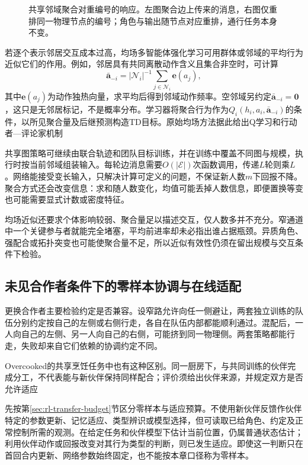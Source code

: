 \begin{figure}[htbp]
 \centering
 
 \caption{共享邻域聚合对重编号的响应。左图聚合边上传来的消息，右图仅重排同一物理节点的编号；角色与输出随节点对应重排，通行任务本身不变。}
 \label{fig:rl-multi-agent-graph}
\end{figure}

若逐个表示邻居交互成本过高，均场多智能体强化学习可用群体或邻域的平均行为近似它们的作用。例如，邻居具有共同离散动作含义且集合非空时，可计算
\[
 \bar{\bm a}_{-i}
 =|\mathcal N_i|^{-1}\sum_{j\in\mathcal N_i}\bm e(a_j),
\]
其中$\bm e(a_j)$为动作独热向量，求平均后得到邻域动作频率。空邻域另约定$\bar{\bm a}_{-i}=\bm0$，这只是无邻居标记，不是概率分布。学习器将聚合行为作为$Q_i(h_i,a_i,\bar{\bm a}_{-i})$的条件，以所见聚合量及后继预测构造TD目标。原始均场方法据此给出Q学习和行动者—评论家机制

共享图策略可继续由联合轨迹和团队目标训练，并在训练中覆盖不同图与规模，执行时按当前邻域组装输入。每轮边消息需要$O(|\mathcal E|)$次函数调用，传递$L$轮则乘$L$。网络能接受变长输入，只解决计算可定义的问题，不保证新人数$m$下回报不降。聚合方式还会改变信息：求和随人数变化，均值可能丢掉人数信息，即便置换等变也可能需要显式计数或密度特征。

均场近似还要求个体影响较弱、聚合量足以描述交互，仅人数多并不充分。窄通道中一个关键参与者就能完全堵塞，平均前进率却未必指出谁占据瓶颈。异质角色、强配合或拓扑突变也可能使聚合量不足，所以近似有效性仍须在留出规模与交互条件下检验。

\subsection{未见合作者条件下的零样本协调与在线适配}
\label{sec:rl-multi-agent-new-partners}

更换合作者主要检验约定是否兼容。设窄路允许向任一侧避让，两套独立训练的队伍分别约定按自己的左侧或右侧行走，各自在队伍内部都能顺利通过。混配后，一人向自己的左侧、另一人向自己的右侧，可能挤到同一物理侧。两套策略都能行走，失败却来自它们依赖的协调约定不同。

Overcooked的共享烹饪任务中也有这种区别。同一厨房下，与共同训练的伙伴完成分工，不代表能与新伙伴保持同样配合；评价须给出伙伴来源，并规定双方是否允许适应

先按第\ref{sec:rl-transfer-budget}节区分零样本与适应预算。不使用新伙伴反馈作伙伴特定的参数更新、记忆适应、类型辨识或模型选择，但可读取已给角色、约定及正常控制所需的观测。在给定任务和伙伴模型下估计当前位置，仍属普通状态估计；利用伙伴动作或回报改变对其行为类型的判断，则已发生适应。即使这一判断只在首回合内更新、网络参数始终固定，也不能按本章口径称为零样本。

